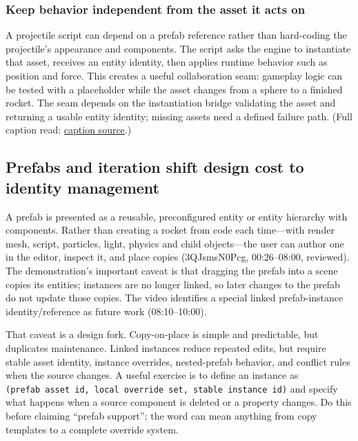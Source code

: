\subsubsection{Keep behavior independent from the asset it acts on}\label{06-engine-ii-ch033-keep-behavior-independent-from-the-asset-it-acts-on}

\hypertarget{06-engine-ii-ch033-keep-behavior-independent-from-the-asset-it-acts-on}{}

A projectile script can depend on a prefab reference rather than hard-coding the projectile's appearance and components. The script asks the engine to instantiate that asset, receives an entity identity, then applies runtime behavior such as position and force. This creates a useful collaboration seam: gameplay logic can be tested with a placeholder while the asset changes from a sphere to a finished rocket. The seam depends on the instantiation bridge validating the asset and returning a usable entity identity; missing assets need a defined failure path. (Full caption read: \href{https://www.youtube.com/watch?v=ogQTYSokqAI}{caption source}.)

\subsection{Prefabs and iteration shift design cost to identity management}\label{06-engine-ii-ch033-prefabs-and-iteration-shift-design-cost-to-identity-management}

\hypertarget{06-engine-ii-ch033-prefabs-and-iteration-shift-design-cost-to-identity-management}{}

A prefab is presented as a reusable, preconfigured entity or entity hierarchy with components. Rather than creating a rocket from code each time---with render mesh, script, particles, light, physics and child objects---the user can author one in the editor, inspect it, and place copies (3QJsmsN0Pcg, 00:26--08:00, reviewed). The demonstration's important caveat is that dragging the prefab into a scene copies its entities; instances are no longer linked, so later changes to the prefab do not update those copies. The video identifies a special linked prefab-instance identity/reference as future work (08:10--10:00).

That caveat is a design fork. Copy-on-place is simple and predictable, but duplicates maintenance. Linked instances reduce repeated edits, but require stable asset identity, instance overrides, nested-prefab behavior, and conflict rules when the source changes. A useful exercise is to define an instance as \texttt{(prefab\ asset\ id,\ local\ override\ set,\ stable\ instance\ id)} and specify what happens when a source component is deleted or a property changes. Do this before claiming ``prefab support''; the word can mean anything from copy templates to a complete override system.

